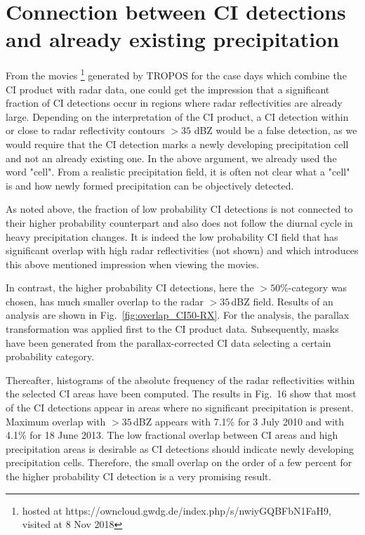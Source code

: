 \section{Connection between CI detections and already existing precipitation}
From the movies \footnote{hosted at https://owncloud.gwdg.de/index.php/s/nwiyGQBFbN1FaH9, visited at 8 Nov 2018} generated by TROPOS for the case days which combine the CI product with radar data, one could get the impression that a significant fraction of CI detections occur in regions where radar reflectivities are already large. Depending on the interpretation of the CI product, a CI detection within or close to radar reflectivity contours $>35$ dBZ would be a false detection, as we would require that the CI detection marks a newly  developing precipitation cell and not an already existing one. In the above argument, we already used the word "cell". From a realistic precipitation field, it is often not clear what a "cell" is and how newly formed precipitation can be objectively detected. 

As noted above, the fraction of low probability CI detections is not connected to their higher probability counterpart and also does not follow the diurnal cycle in heavy precipitation changes. It is indeed the low probability CI field that has significant overlap with high radar reflectivities (not shown) and which introduces this above mentioned impression when viewing the movies. 

In contrast, the higher probability CI detections, here the $>50\%$-category was chosen, has much smaller overlap to the radar $>35$\,dBZ field. Results of an analysis are shown in Fig.~\ref{fig:overlap_CI50-RX}. For the analysis, the parallax transformation was applied first to the CI product data. Subsequently, masks have been generated from the parallax-corrected CI data selecting a certain probability category. 

Thereafter, histograms of the absolute frequency of the radar reflectivities within the selected CI areas have been computed. The results in Fig.~16 show that most of the CI detections appear in areas where no significant precipitation is present. Maximum overlap with $>35$\,dBZ appears with 7.1\% for 3 July 2010 and with 4.1\% for 18 June 2013. The low fractional overlap between CI areas and high precipitation areas is desirable as CI detections should indicate newly developing precipitation cells. Therefore, the small overlap on the order of a few percent for the higher probability CI detection is a very promising result.

